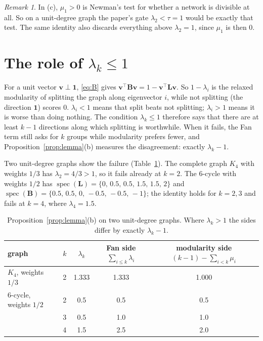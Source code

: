\documentclass[11pt,a4paper]{article}
\newcommand{\Lap}{\mathbf{L}}
\newcommand{\Bmat}{\mathbf{B}}
\newcommand{\vvec}{\mathbf{v}}
\newcommand{\one}{\mathbf{1}}
\theoremstyle{remark}
\newtheorem*{remark}{Remark}
\begin{document}
\begin{remark}
In (c), $\mu_1>0$ is Newman's test for whether a network is divisible at all. So on a
unit-degree graph the paper's gate $\lambda_2<\tau=1$ would be exactly that test. The
same identity also discards everything above $\lambda_2=1$, since $\mu_1$ is then 0.
\end{remark}

\section{The role of $\lambda_k\le1$}\label{sec:role}

For a unit vector $\vvec\perp\one$, \eqref{eq:B} gives
$\vvec^\top\Bmat\vvec=1-\vvec^\top\Lap\vvec$. So $1-\lambda_i$ is the relaxed
modularity of splitting the graph along eigenvector $i$, while not splitting (the
direction $\one$) scores 0. $\lambda_i<1$ means that split beats not splitting;
$\lambda_i>1$ means it is worse than doing nothing. The condition $\lambda_k\le1$
therefore says that there are at least $k-1$ directions along which splitting is
worthwhile. When it fails, the Fan term still asks for $k$ groups while modularity
prefers fewer, and Proposition~\ref{prop:lemma}(b) measures the disagreement:
exactly $\lambda_k-1$.

Two unit-degree graphs show the failure (Table~\ref{tab:cex}).
The complete graph $K_4$ with weights $1/3$ has $\lambda_2=4/3>1$, so it fails
already at $k=2$. The 6-cycle with weights $1/2$ has
$\operatorname{spec}(\Lap)=\{0,\,0.5,\,0.5,\,1.5,\,1.5,\,2\}$ and
$\operatorname{spec}(\Bmat)=\{0.5,\,0.5,\,0,\,-0.5,\,-0.5,\,-1\}$; the identity holds
for $k=2,3$ and fails at $k=4$, where $\lambda_4=1.5$.

\begin{table}[h]
\centering\small
\begin{tabular}{lcccc}
\toprule
graph & $k$ & $\lambda_k$ & Fan side $\sum_{i\le k}\lambda_i$ & modularity side $(k-1)-\sum_{i<k}\mu_i$ \\
\midrule
$K_4$, weights $1/3$ & 2 & 1.333 & 1.333 & 1.000 \\
6-cycle, weights $1/2$ & 2 & 0.5 & 0.5 & 0.5 \\
 & 3 & 0.5 & 1.0 & 1.0 \\
 & 4 & 1.5 & 2.5 & 2.0 \\
\bottomrule
\end{tabular}
\caption{Proposition~\ref{prop:lemma}(b) on two unit-degree graphs. Where
$\lambda_k>1$ the sides differ by exactly $\lambda_k-1$.}
\label{tab:cex}
\end{table}
\end{document}
